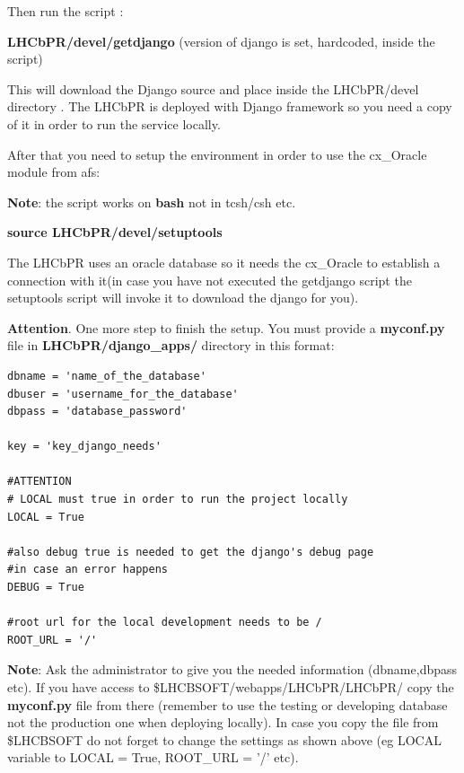 \documentclass{lhcbnote}
\begin{document}
\vspace{2 mm}

Then run the script :

\vspace{2 mm}


{\bf LHCbPR/devel/getdjango} (version of django is set, hardcoded, inside the script)

\vspace{2 mm}

This will download the Django source and place inside the LHCbPR/devel directory . 
The LHCbPR is deployed with Django framework so you need a copy of it in order to 
run the service locally.

After that you need to setup the environment in order to use the cx\_Oracle module from afs:

{\bf Note}: the script works on {\bf bash} not in tcsh/csh etc.
\vspace{2 mm}

{\bf source LHCbPR/devel/setuptools}

\vspace{2 mm}

The LHCbPR uses an oracle database
so it needs the cx\_Oracle to establish a connection with it(in case you have not executed the getdjango script the setuptools script will invoke it to download the django for you).

{\bf Attention}. One more step to finish the setup. You must provide a {\bf myconf.py}
file in {\bf LHCbPR/django\_apps/} directory in this format:

\begin{verbatim}
dbname = 'name_of_the_database'
dbuser = 'username_for_the_database'
dbpass = 'database_password'

key = 'key_django_needs'

#ATTENTION
# LOCAL must true in order to run the project locally
LOCAL = True

#also debug true is needed to get the django's debug page
#in case an error happens
DEBUG = True

#root url for the local development needs to be /
ROOT_URL = '/'
\end{verbatim}

{\bf Note}: Ask the administrator to give you the needed information (dbname,dbpass etc). If you have access 
to {\$LHCBSOFT/webapps/LHCbPR/LHCbPR/} copy the {\bf myconf.py} file from there (remember to use the testing or developing database not the production one when 
deploying locally). In case you copy the file from \$LHCBSOFT do not forget to change the settings as shown above (eg  LOCAL variable to LOCAL = True, ROOT\_URL = '/' etc). 
\end{document}
